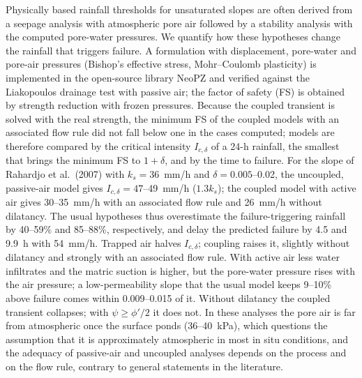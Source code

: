 Physically based rainfall thresholds for unsaturated slopes are often derived from a seepage analysis with atmospheric
pore air followed by a stability analysis with the computed pore-water pressures. We quantify how these hypotheses
change the rainfall that triggers failure. A formulation with displacement, pore-water and pore-air pressures
(Bishop's effective stress, Mohr--Coulomb plasticity) is implemented in the open-source library NeoPZ and verified
against the Liakopoulos drainage test with passive air; the factor of safety (FS) is obtained by strength reduction
with frozen pressures. Because the coupled transient is solved with the real strength, the minimum FS of the coupled
models with an associated flow rule did not fall below one in the cases computed; models are therefore compared by the critical intensity
$I_{c,\delta}$ of a 24-h rainfall, the smallest that brings the minimum FS to $1+\delta$, and by the time to failure.
For the slope of Rahardjo et al.\ (2007) with $k_s=36$~mm/h and $\delta=0.005$--0.02, the uncoupled, passive-air model
gives $I_{c,\delta}=47$--49~mm/h ($1.3k_s$); the coupled model with active air gives 30--35~mm/h with an associated
flow rule and 26~mm/h without dilatancy. The usual hypotheses thus overestimate the failure-triggering rainfall by
40--59\% and 85--88\%, respectively, and delay the predicted failure by 4.5 and 9.9~h with 54~mm/h. Trapped air
halves $I_{c,\delta}$; coupling raises it, slightly without dilatancy and strongly with an associated flow rule. With
active air less water infiltrates and the matric suction is higher, but the pore-water pressure rises with the air
pressure; a low-permeability slope that the usual model keeps 9--10\% above failure comes within 0.009--0.015 of it.
Without dilatancy the coupled transient collapses; with $\psi\ge\phi'/2$ it does not. In these analyses the pore air
is far from atmospheric once the surface ponds (36--40~kPa), which questions the assumption that it is approximately
atmospheric in most in situ conditions, and the adequacy of passive-air and uncoupled analyses depends on the process
and on the flow rule, contrary to general statements in the literature.
